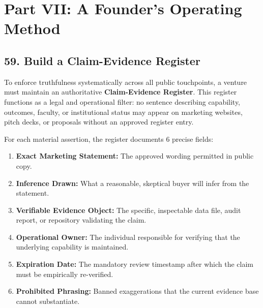 \section*{Part VII: A Founder's Operating Method}

\subsection*{59. Build a Claim-Evidence Register}

To enforce truthfulness systematically across all public touchpoints, a venture must maintain an authoritative \textbf{Claim-Evidence Register}. This register functions as a legal and operational filter: no sentence describing capability, outcomes, faculty, or institutional status may appear on marketing websites, pitch decks, or proposals without an approved register entry.

For each material assertion, the register documents 6 precise fields:
\begin{enumerate}
\item \textbf{Exact Marketing Statement:} The approved wording permitted in public copy.
\item \textbf{Inference Drawn:} What a reasonable, skeptical buyer will infer from the statement.
\item \textbf{Verifiable Evidence Object:} The specific, inspectable data file, audit report, or repository validating the claim.
\item \textbf{Operational Owner:} The individual responsible for verifying that the underlying capability is maintained.
\item \textbf{Expiration Date:} The mandatory review timestamp after which the claim must be empirically re-verified.
\item \textbf{Prohibited Phrasing:} Banned exaggerations that the current evidence base cannot substantiate.
\end{enumerate}

